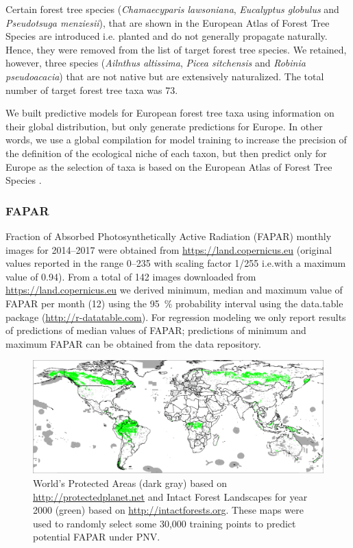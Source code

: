 \documentclass[fleqn,10pt,lineno]{wlpeerj} %
\begin{document}
Certain forest tree species (\emph{Chamaecyparis lawsoniana}, \emph{Eucalyptus globulus} and  \emph{Pseudotsuga menziesii}), that are shown in the European Atlas of Forest Tree Species are introduced i.e. planted and do not generally propagate naturally. Hence, they were removed from the list of target forest tree species. We retained, however, three species (\emph{Ailnthus altissima}, \emph{Picea sitchensis} and \emph{Robinia pseudoacacia}) that are not native but are extensively naturalized. The total number of target forest tree taxa was 73.\par

We built predictive models for European forest tree taxa using information on their global distribution, but only generate predictions for Europe. In other words, we use a global compilation for model training to increase the precision of the definition of the ecological niche of each taxon, but then predict only for Europe as the selection of taxa is based on the European Atlas of Forest Tree Species \citep{san2016european}. \par

\subsubsection*{FAPAR}

Fraction of Absorbed Photosynthetically Active Radiation (FAPAR) monthly images for 2014--2017 were obtained from \url{https://land.copernicus.eu} (original values reported in the range 0--235 with scaling factor 1/255 i.e.\@ with a maximum value of 0.94). From a total of 142 images downloaded from \url{https://land.copernicus.eu} we derived minimum, median and maximum value of FAPAR per month (12) using the \SI{95}{\percent} probability interval using the \textsf{data.table} package (\url{http://r-datatable.com}). For regression modeling we only report results of predictions of median values of FAPAR; predictions of minimum and maximum FAPAR can be obtained from the data repository.\par

\begin{figure}[!hbt]
\centering
\includegraphics[width=\linewidth]{Fig_4.png}
\caption{World's Protected Areas (dark gray) based on \url{http://protectedplanet.net} and Intact Forest Landscapes for year 2000 (green) based on \url{http://intactforests.org}. These maps were used to randomly select some 30,000 training points to predict potential FAPAR under PNV.}
\label{Fig_intactareas_worldmap}
\end{figure}
\end{document}
